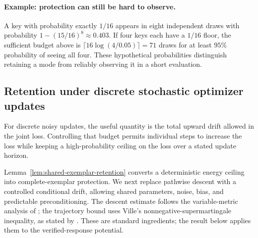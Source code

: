 \paragraph{Example: protection can still be hard to observe.}
A key with probability exactly $1/16$ appears in eight independent draws
with probability $1-(15/16)^8\approx0.403$. If four keys each have a $1/16$
floor, the sufficient budget above is
$\lceil16\log(4/0.05)\rceil=71$ draws for at least $95\%$ probability of
seeing all four. These hypothetical probabilities distinguish retaining a
mode from reliably observing it in a short evaluation.

\subsection{Retention under discrete stochastic optimizer updates}
\label{app:theory-optimizer}

For discrete noisy updates, the useful quantity is the total upward drift
allowed in the joint loss. Controlling that budget permits individual steps
to increase the loss while keeping a high-probability ceiling on the loss
over a stated update horizon.

Lemma~\ref{lem:shared-exemplar-retention} converts a deterministic energy
ceiling into complete-exemplar protection. We next replace pathwise descent
with a controlled conditional drift, allowing shared parameters, noise,
bias, and predictable preconditioning. The descent estimate follows the
variable-metric analysis of \citet[Section~2]{wang2017sqn}; the trajectory
bound uses Ville's nonnegative-supermartingale inequality, as stated by
\citet[Lemma~1]{howard2020timeuniform}. These are standard ingredients;
the result below applies them to the verified-response potential.


